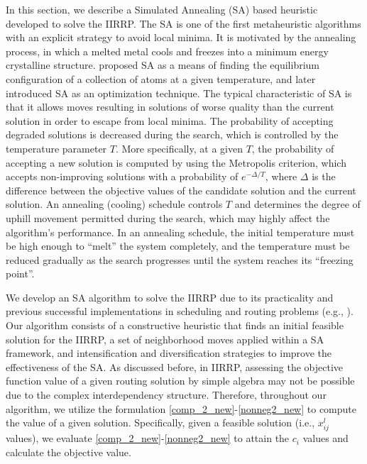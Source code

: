 \documentclass[11pt]{article}
\begin{document}
In this section, we describe a Simulated Annealing (SA) based heuristic developed to solve the IIRRP. The SA is one of the first metaheuristic algorithms with an explicit strategy to avoid local minima. It is motivated by the annealing process, in which a melted metal cools and freezes into a minimum energy crystalline structure. \cite{metropolis1953} proposed SA as a means of finding the equilibrium configuration of a collection of atoms at a given temperature, and later \cite{kirkpatrick_optimization_1983} introduced SA as an optimization technique. The typical characteristic of SA is that it allows moves resulting in solutions of worse quality than the current solution in order to escape from local minima. The probability of accepting degraded solutions is decreased during the search, which is controlled by the temperature parameter $T$. More specifically, at a given $T$, the probability of accepting a new solution is computed by using the Metropolis criterion, which accepts non-improving solutions with a probability of $e^{-\Delta/T}$, where $\Delta$ is the difference between the objective values of the candidate solution and the current solution. An annealing (cooling) schedule controls $T$ and determines the degree of uphill movement permitted during the search, which may highly affect the algorithm's performance. In an annealing schedule, the initial temperature must be high enough to ``melt'' the system completely, and the temperature must be reduced gradually as the search progresses until the system reaches its ``freezing point''. 


We develop an SA algorithm to solve the IIRRP due to its practicality and previous successful implementations in scheduling and routing problems (e.g., \citet{li2005, afifi2016}). Our algorithm consists of a constructive heuristic that finds an initial feasible solution for the IIRRP, a set of neighborhood moves applied within a SA framework, and intensification and diversification strategies to improve the effectiveness of the SA. As discussed before, in IIRRP, assessing the objective function value of a given routing solution by simple algebra may not be possible due to the complex interdependency structure. Therefore, throughout our algorithm, we utilize the formulation \eqref{comp_2_new}-\eqref{nonneg2_new} to compute the value of a given solution. Specifically, given a feasible solution (i.e., $x^l_{ij}$ values), we evaluate \eqref{comp_2_new}-\eqref{nonneg2_new} to attain the $c_i$ values and calculate the objective value. 
\end{document}
